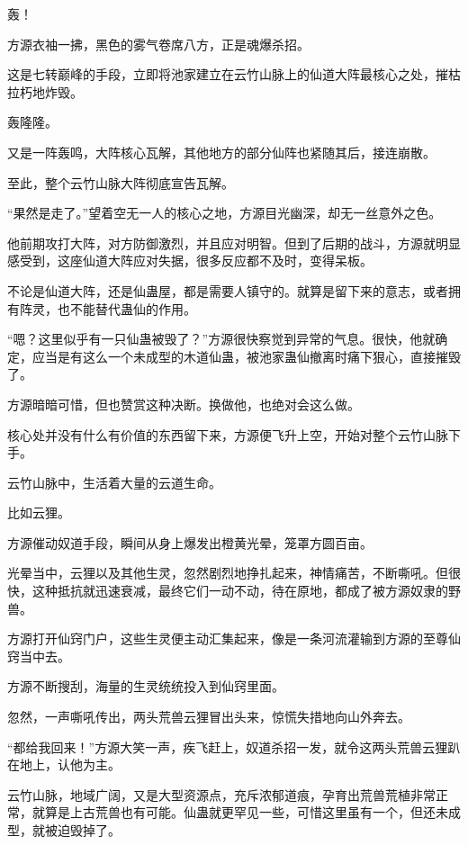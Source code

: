 
\begin{this_body}



轰！

方源衣袖一拂，黑色的雾气卷席八方，正是魂爆杀招。

这是七转巅峰的手段，立即将池家建立在云竹山脉上的仙道大阵最核心之处，摧枯拉朽地炸毁。

轰隆隆。

又是一阵轰鸣，大阵核心瓦解，其他地方的部分仙阵也紧随其后，接连崩散。

至此，整个云竹山脉大阵彻底宣告瓦解。

“果然是走了。”望着空无一人的核心之地，方源目光幽深，却无一丝意外之色。

他前期攻打大阵，对方防御激烈，并且应对明智。但到了后期的战斗，方源就明显感受到，这座仙道大阵应对失据，很多反应都不及时，变得呆板。

不论是仙道大阵，还是仙蛊屋，都是需要人镇守的。就算是留下来的意志，或者拥有阵灵，也不能替代蛊仙的作用。

“嗯？这里似乎有一只仙蛊被毁了？”方源很快察觉到异常的气息。很快，他就确定，应当是有这么一个未成型的木道仙蛊，被池家蛊仙撤离时痛下狠心，直接摧毁了。

方源暗暗可惜，但也赞赏这种决断。换做他，也绝对会这么做。

核心处并没有什么有价值的东西留下来，方源便飞升上空，开始对整个云竹山脉下手。

云竹山脉中，生活着大量的云道生命。

比如云狸。

方源催动奴道手段，瞬间从身上爆发出橙黄光晕，笼罩方圆百亩。

光晕当中，云狸以及其他生灵，忽然剧烈地挣扎起来，神情痛苦，不断嘶吼。但很快，这种抵抗就迅速衰减，最终它们一动不动，待在原地，都成了被方源奴隶的野兽。

方源打开仙窍门户，这些生灵便主动汇集起来，像是一条河流灌输到方源的至尊仙窍当中去。

方源不断搜刮，海量的生灵统统投入到仙窍里面。

忽然，一声嘶吼传出，两头荒兽云狸冒出头来，惊慌失措地向山外奔去。

“都给我回来！”方源大笑一声，疾飞赶上，奴道杀招一发，就令这两头荒兽云狸趴在地上，认他为主。

云竹山脉，地域广阔，又是大型资源点，充斥浓郁道痕，孕育出荒兽荒植非常正常，就算是上古荒兽也有可能。仙蛊就更罕见一些，可惜这里虽有一个，但还未成型，就被迫毁掉了。


\end{this_body}
